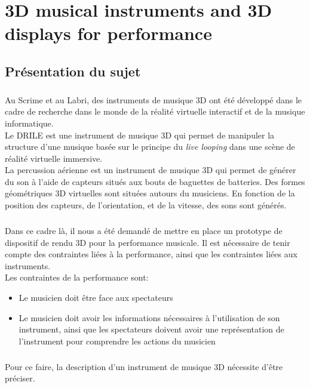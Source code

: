 \chapter{3D musical instruments and 3D displays for performance}
\section{Présentation du sujet}
\paragraph{}
Au Scrime et au Labri, des instruments de musique 3D ont été développé dans le cadre de recherche dans le monde de la réalité virtuelle interactif et de la musique informatique. 
\\
Le DRILE \cite{berthaut2010drile} est une instrument de musique 3D qui permet de manipuler la structure d'une musique basée sur le principe du \textit{live looping} dans une scène de réalité virtuelle immersive.
\\
La percussion aérienne est un instrument de musique 3D qui permet de générer du son à l'aide de capteurs situés aux bouts de baguettes de batteries. Des formes géométriques 3D virtuelles sont situées autours du musiciens. En fonction de la position des capteurs, de l'orientation, et de la vitesse, des sons sont générés.

\paragraph{}
Dans ce cadre là, il nous a été demandé de mettre en place un prototype de dispositif de rendu 3D pour la performance musicale. Il est nécessaire de tenir compte des contraintes liées à la performance, ainsi que les contraintes liées aux instruments.
\\
Les contraintes de la performance sont:
\begin{itemize}
\item Le musicien doit être face aux spectateurs
\item Le musicien doit avoir les informations nécessaires à l'utilisation de son instrument, ainsi que les spectateurs doivent avoir une représentation de l'instrument pour comprendre les actions du musicien
\end{itemize}

\paragraph{}
Pour ce faire, la description d'un instrument de musique 3D nécessite d'être préciser.

